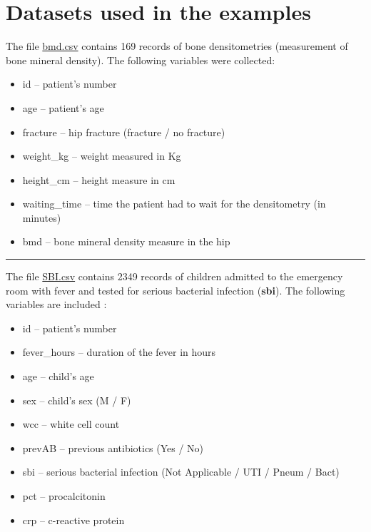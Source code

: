 \documentclass[
]{book}
\providecommand{\tightlist}{%
  \setlength{\itemsep}{0pt}\setlength{\parskip}{0pt}}
\begin{document}
\section*{Datasets used in the examples}\label{datasets-used-in-the-examples}

The file \href{https://www.dropbox.com/s/7wjsfdaf0wt2kg2/bmd.csv?dl=1}{bmd.csv}
contains 169 records of bone densitometries (measurement of
bone mineral density). The following variables were collected:

\begin{itemize}
\tightlist
\item
  id -- patient's number
\item
  age -- patient's age
\item
  fracture -- hip fracture (fracture / no fracture)
\item
  weight\_kg -- weight measured in Kg
\item
  height\_cm -- height measure in cm
\item
  waiting\_time -- time the patient had to wait for the densitometry (in minutes)
\item
  bmd -- bone mineral density measure in the hip
\end{itemize}

\begin{center}\rule{0.5\linewidth}{0.5pt}\end{center}

The file \href{https://www.dropbox.com/s/da3by5vuzkv77xi/SBI.csv?dl=1}{SBI.csv}
contains 2349 records of children admitted to the emergency room
with fever and tested for serious bacterial infection (\textbf{sbi}). The following
variables are included :

\begin{itemize}
\tightlist
\item
  id -- patient's number
\item
  fever\_hours -- duration of the fever in hours
\item
  age -- child's age
\item
  sex -- child's sex (M / F)
\item
  wcc -- white cell count
\item
  prevAB -- previous antibiotics (Yes / No)
\item
  sbi -- serious bacterial infection (Not Applicable / UTI / Pneum / Bact)
\item
  pct -- procalcitonin
\item
  crp -- c-reactive protein
\end{itemize}
\end{document}
